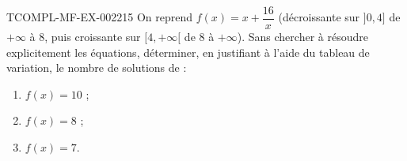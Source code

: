 \begin{exercice}{TCOMPL-MF-EX-002}{2}{15}
On reprend $f(x) = x + \dfrac{16}{x}$ (décroissante sur $]0,4]$ de $+\infty$ à $8$, puis croissante sur $[4,+\infty[$ de $8$ à $+\infty$). Sans chercher à résoudre explicitement les équations, déterminer, en justifiant à l'aide du tableau de variation, le nombre de solutions de :
\begin{enumerate}
  \item $f(x) = 10$ ;
  \item $f(x) = 8$ ;
  \item $f(x) = 7$.
\end{enumerate}
\end{exercice}
